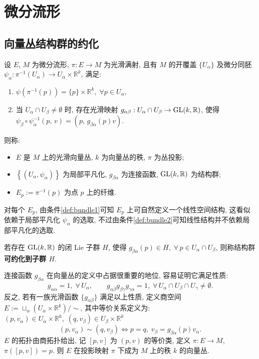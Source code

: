 \chapter{微分流形}
    \section{向量丛结构群的约化}
    \begin{definition}[向量丛的定义]
        设 $E$, $M$ 为微分流形, $\pi:E\rightarrow M$ 为光滑满射, 且有 $M$ 的开覆盖 $\{U_{\alpha}\}$ 
        及微分同胚 $\psi_{\alpha}:\pi^{-1}(U_{\alpha})\rightarrow U_{\alpha}\times\mathbb{R}^k$, 满足:
        \begin{enumerate}
            \item\label{def:bundle1} $\psi(\pi^{-1}(p))=\{p\}\times\mathbb{R}^k,\;\forall p\in U_{\alpha}$,
            \item\label{def:bundle2} 当 $U_{\alpha}\cap U_{\beta}\neq\emptyset$ 时, 存在光滑映射 $g_{\alpha\beta}:U_{\alpha}\cap U_{\beta}\rightarrow{\rm GL}(k,\mathbb{R})$, 使得 $\psi_{\beta}\circ\psi_{\alpha}^{-1}(p,\,v)=(p,\,g_{\beta\alpha}(p)v)$.
        \end{enumerate}
        则称:
        \begin{itemize}
            \item $E$ 是 $M$ 上的光滑向量丛, $k$ 为向量丛的秩, $\pi$ 为丛投影;
            \item $\left\{(U_{\alpha}, \psi_{\alpha})\right\}$ 为局部平凡化, $g_{\beta\alpha}$ 为连接函数, ${\rm GL}(k,\mathbb{R})$ 为结构群;
            \item $E_p:=\pi^{-1}(p)$ 为点 $p$ 上的纤维.
        \end{itemize}
        对每个 $E_p$, 由条件\ref{def:bundle1}可知 $E_p$ 上可自然定义一个线性空间结构, 这看似依赖于局部平凡化 $\psi_{\alpha}$ 的选取, 不过由条件\ref{def:bundle2}可知线性结构并不依赖局部平凡化的选取.
        
        若存在 ${\rm GL}(k,\mathbb{R})$ 的闭 {\rm Lie} 子群 $H$, 使得 $g_{\beta\alpha}(p)\in H,\;\forall\,p\in U_{\alpha}\cap U_{\beta}$, 则称结构群{\bf 可约化到子群 $H$}.
    \end{definition}

    连接函数 $g_{\beta\alpha}$ 在向量丛的定义中占据很重要的地位, 容易证明它满足性质:
    \begin{equation*}
        g_{\alpha\alpha} = 1,\;\forall\,U_{\alpha},\qquad g_{\alpha\beta}g_{\beta\gamma}g_{\gamma\alpha} = 1,\;\forall\,U_{\alpha}\cap U_{\beta}\cap U_{\gamma}\neq\emptyset.
    \end{equation*}
    反之, 若有一族光滑函数 $\{g_{\alpha\beta}\}$ 满足以上性质, 定义商空间 $E:=\sqcup_{\alpha}(U_{\alpha}\times\mathbb{R}^k)\big/\sim$, 其中等价关系定义为: $(p,v_{\alpha})\in U_{\alpha}\times\mathbb{R}^k,\;(q,v_{\beta})\in U_{\beta}\times\mathbb{R}^k$
    \begin{equation*}
        (p,v_{\alpha})\sim(q,v_{\beta})\Leftrightarrow p=q,\;v_{\beta}=g_{\beta\alpha}(p)v_{\alpha}.
    \end{equation*}
    $E$ 的拓扑由商拓扑给出, 记 $[p,v]$ 为 $(p,v)$ 的等价类, 定义 $\pi:E\rightarrow M$, $\pi([p,v])=p$. 则 $E$ 在投影映射 $\pi$ 下成为 $M$ 上的秩 $k$ 的向量丛. 

